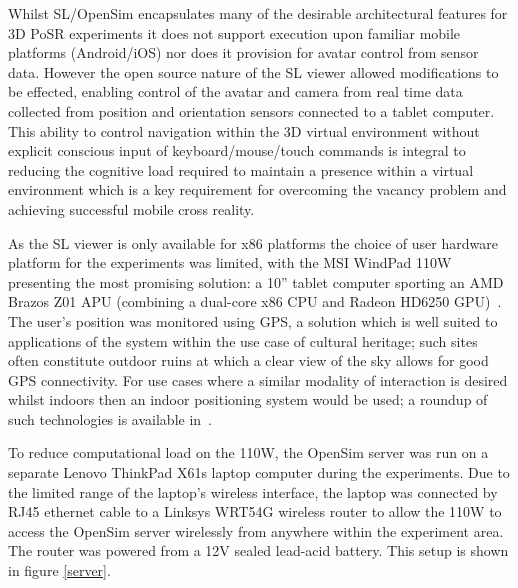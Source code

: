 Whilst SL/OpenSim encapsulates many of the desirable architectural features for 3D PoSR experiments it does not support execution upon familiar mobile platforms (Android/iOS) nor does it provision for avatar control from sensor data. However the open source nature of the SL viewer allowed modifications to be effected, enabling control of the avatar and camera from real time data collected from position and orientation sensors connected to a tablet computer. This ability to control navigation within the 3D virtual environment without explicit conscious input of keyboard/mouse/touch commands is integral to reducing the cognitive load required to maintain a presence within a virtual environment which is a key requirement for overcoming the vacancy problem and achieving successful mobile cross reality.

As the SL viewer is only available for x86 platforms the choice of user hardware platform for the experiments was limited, with the MSI WindPad 110W presenting the most promising solution: a 10'' tablet computer sporting an AMD Brazos Z01 APU (combining a dual-core x86 CPU and Radeon HD6250 GPU)~\cite{Micro-StarInt'lCo.}. The user's position was monitored using GPS, a solution which is well suited to applications of the system within the use case of cultural heritage; such sites often constitute outdoor ruins at which a clear view of the sky allows for good GPS connectivity. For use cases where a similar modality of interaction is desired whilst indoors then an indoor positioning system would be used; a roundup of such technologies is available in~\cite{Mautz2012}.

To reduce computational load on the 110W, the OpenSim server was run on a separate Lenovo ThinkPad X61s laptop computer during the experiments. Due to the limited range of the laptop's wireless interface, the laptop was connected by RJ45 ethernet cable to a Linksys WRT54G wireless router to allow the 110W to access the OpenSim server wirelessly from anywhere within the experiment area. The router was powered from a 12V sealed lead-acid battery. This setup is shown in figure \ref{server}.


